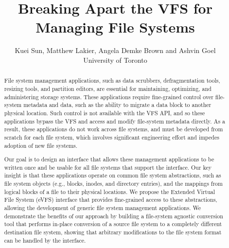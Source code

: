 \documentclass[letterpaper,twocolumn,10pt]{article}
\date{}
\begin{document}
\title{\Large \bf Breaking Apart the VFS for Managing File Systems}
\author{
  {\rm Kuei Sun, Matthew Lakier, Angela Demke Brown and Ashvin Goel}\\
  University of Toronto
} %

\maketitle

\begin{abstract}
File system management applications, such as data scrubbers, defragmentation tools, resizing tools, and partition editors, are essential for maintaining, optimizing, and administering storage systems. These applications require fine-grained control over file-system metadata and data, such as the ability to migrate a data block to another physical location. Such control is not available with the VFS API, and so these applications bypass the VFS and access and modify file-system metadata directly. As a result, these applications do not work across file systems, and must be developed from scratch for each file system, which involves significant engineering effort and impedes adoption of new file systems.

Our goal is to design an interface that allows these management applications to be written once and be usable for all file systems that support the interface. Our key insight is that these applications operate on common file system abstractions, such as file system objects (e.g., blocks, inodes, and directory entries), and the mappings from logical blocks of a file to their physical locations. We propose the Extended Virtual File System (eVFS) interface that provides fine-grained access to these abstractions, allowing the development of generic file system management applications. We demonstrate the benefits of our approach by building a file-system agnostic conversion tool that performs in-place conversion of a source file system to a completely different destination file system, showing that arbitrary modifications to the file system format can be handled by the interface.

\end{abstract}








\end{document}

